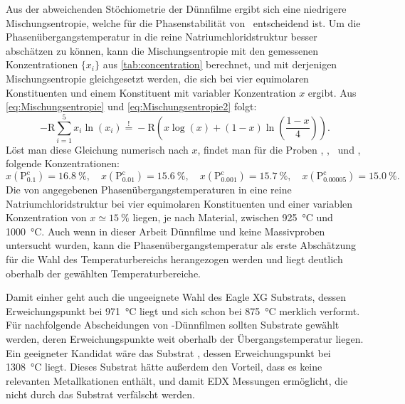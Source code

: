 Aus der abweichenden Stöchiometrie der Dünnfilme ergibt sich eine niedrigere Mischungsentropie, welche für die
Phasenstabilität von \heo\ entscheidend ist.
Um die Phasenübergangstemperatur in die reine Natriumchloridstruktur besser abschätzen zu können, kann die
Mischungsentropie mit den gemessenen Konzentrationen $\{ x_i \}$ aus \cref{tab:concentration} berechnet, und mit
derjenigen Mischungsentropie gleichgesetzt werden, die sich bei vier equimolaren Konstituenten und einem Konstituent mit
variabler Konzentration $x$ ergibt.
Aus \cref{eq:Mischungsentropie} und \cref{eq:Mischungsentropie2} folgt:
\begin{equation}
    -\mathrm{R}\sum_{i=1}^{5}x_{i}\ln(x_{i}) \stackrel{!}{=}-\mathrm{R}\left( x\log(x)+(1-x)\ln
    \left( \frac{1-x}{4} \right) \right).
    \label{eq:fazit}
\end{equation}
Löst man diese Gleichung numerisch nach $x$, findet man für die Proben \csamplethree, \csampleone, \csampletwo\ und \csamplefour,
folgende Konzentrationen:
\begin{equation*}
    x(\mathrm{P}_{\num{0.1}}^{\mathrm{c}}) = \qty{16.8}{\percent}, \quad x(\mathrm{P}_{\num{0.01}}^{\mathrm{c}})
    = \qty{15.6}{\percent}, \quad
    x(\mathrm{P}_{\num{0.001}}^{\mathrm{c}}) = \qty{15.7}{\percent}, \quad x(\mathrm{P}_{\num{0.00005}}^{\mathrm{c}})
    = \qty{15.0}{\percent}.
\end{equation*}
Die von  angegebenen Phasenübergangstemperaturen in eine reine Natriumchloridstruktur
bei vier equimolaren Konstituenten und einer variablen Konzentration von $x \simeq \qty{15}{\percent}$ liegen, je nach
Material, zwischen \qty{925}{\degreeCelsius} und \qty{1000}{\degreeCelsius}.
Auch wenn in dieser Arbeit Dünnfilme und keine Massivproben untersucht wurden, kann die Phasenübergangstemperatur
als erste Abschätzung für die Wahl des Temperaturbereichs herangezogen werden und liegt deutlich oberhalb der
gewählten Temperaturbereiche.


Damit einher geht auch die ungeeignete Wahl des Eagle XG Substrats, dessen Erweichungspunkt bei
\qty{971}{\degreeCelsius} liegt und sich schon bei \qty{875}{\degreeCelsius} merklich verformt.
Für nachfolgende Abscheidungen von \heo-Dünnfilmen sollten Substrate gewählt werden, deren Erweichungspunkte weit
oberhalb der Übergangstemperatur liegen.
Ein geeigneter Kandidat wäre das Substrat , dessen Erweichungspunkt bei \qty{1308}{\degreeCelsius} liegt.
Dieses Substrat hätte außerdem den Vorteil, dass es keine relevanten Metallkationen enthält, und damit
EDX Messungen ermöglicht, die nicht durch das Substrat verfälscht werden.

